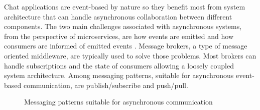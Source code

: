 Chat applications are event-based by nature so they benefit most from system architecture that can handle asynchronous collaboration between different components. The two main challenges associated with asynchronous systems, from the perspective of microservices, are how events are emitted and how consumers are informed of emitted events \cite{newman2015building}. Message brokers, a type of message oriented middleware, are typically used to solve those problems. Most brokers can handle subscriptions and the state of consumers allowing a loosely coupled system architecture. Among messaging patterns, suitable for asynchronous event-based communication, are publish/subscribe and push/pull.
\\
\begin{figure}[h!]
	\centering
	 \hfill
	\caption{Messaging patterns suitable for asynchronous communication \cite{hintjens2010zeromq}}
\end{figure}


